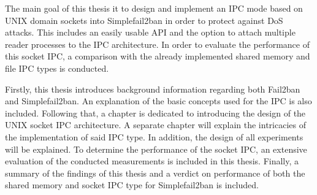 The main goal of this thesis it to design and implement an \ac{IPC} mode based on UNIX domain sockets into Simplefail2ban in order to protect against \ac{DoS} attacks.
This includes an easily usable \ac{API} and the option to attach multiple reader processes to the \ac{IPC} architecture.
In order to evaluate the performance of this socket \ac{IPC}, a comparison with the already implemented shared memory and file \ac{IPC} types is conducted.

Firstly, this thesis introduces background information regarding both Fail2ban and Simplefail2ban.
An explanation of the basic concepts used for the \ac{IPC} is also included.
Following that, a chapter is dedicated to introducing the design of the UNIX socket \ac{IPC} architecture.
A separate chapter will explain the intricacies of the implementation of said \ac{IPC} type.
In addition, the design of all experiments will be explained.
To determine the performance of the socket \ac{IPC}, an extensive evaluation of the conducted measurements is included in this thesis.
Finally, a summary of the findings of this thesis and a verdict on performance of both the shared memory and socket \ac{IPC} type for Simplefail2ban is included.